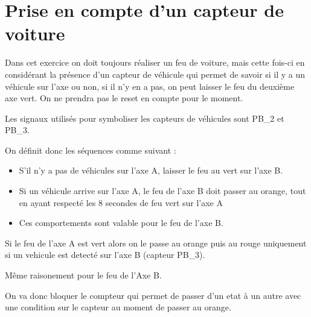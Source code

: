 \documentclass[11pt]{report}
\begin{document}
\section{Prise en compte d'un capteur de voiture}


Dans cet exercice on doit toujours réaliser un feu de voiture, mais cette fois-ci en considérant la présence d'un capteur de véhicule qui permet de savoir si il y a un véhicule sur l'axe ou non, si il n'y en a pas, on peut laisser le feu du deuxième axe vert. On ne prendra pas le reset en compte pour le moment.

Les signaux utilisés pour symboliser les capteurs de véhicules sont PB\_2 et PB\_3.

On définit donc les séquences comme suivant :
\begin{itemize}
	\item S'il n'y a pas de véhicules sur l'axe A, laisser le feu au vert sur l'axe B.
	\item Si un véhicule arrive sur l'axe A, le feu de l'axe B doit passer au orange, tout en ayant respecté les 8 secondes de feu vert sur l'axe A
	\item Ces comportements sont valable pour le feu de l'axe B.

\end{itemize}

Si le feu de l'axe A est vert alors on le passe au orange puis au rouge uniquement
si un vehicule est detecté sur l'axe B (capteur PB_3).

Même raisonement pour le feu de l'Axe B.

On va donc bloquer le compteur qui permet de passer d'un etat à un autre avec
une condition sur le capteur au moment de passer au orange.
\end{document}

